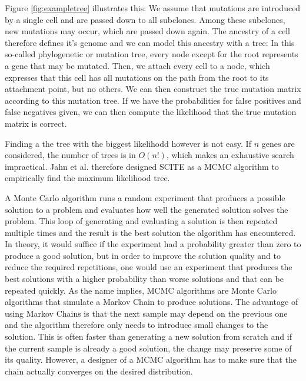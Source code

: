 Figure \ref{fig:exampletree} illustrates this: We assume that mutations are introduced by a single cell and are passed down to all subclones. Among these subclones, new mutations may occur, which are passed down again. The ancestry of a cell therefore defines it's genome and we can model this ancestry with a tree: In this so-called phylogenetic or mutation tree, every node except for the root represents a gene that may be mutated. Then, we attach every cell to a node, which expresses that this cell has all mutations on the path from the root to its attachment point, but no others. We can then construct the true mutation matrix according to this mutation tree. If we have the probabilities for false positives and false negatives given, we can then compute the likelihood that the true mutation matrix is correct. 


Finding a the tree with the biggest likelihodd however is not easy. If $n$ genes are considered, the number of trees is in $O(n!)$, which makes an exhaustive search impractical. Jahn et al. therefore designed \ac{SCITE} as a \ac{MCMC} algorithm to empirically find the maximum likelihood tree.


A Monte Carlo algorithm runs a random experiment that produces a possible solution to a problem and evaluates how well the generated solution solves the problem. This loop of generating and evaluating a solution is then repeated multiple times and the result is the best solution the algorithm has encountered. In theory, it would suffice if the experiment had a probability greater than zero to produce a good solution, but in order to improve the solution quality and to reduce the required repetitions, one would use an experiment that produces the best solutions with a higher probability than worse solutions and that can be repeated quickly. As the name implies, \ac{MCMC} algorithms are Monte Carlo algorithms that simulate a Markov Chain to produce solutions. The advantage of using Markov Chains is that the next sample may depend on the previous one and the algorithm therefore only needs to introduce small changes to the solution. This is often faster than generating a new solution from scratch and if the current sample is already a good solution, the change may preserve some of its quality. However, a designer of a \ac{MCMC} algorithm has to make sure that the chain actually converges on the desired distribution.